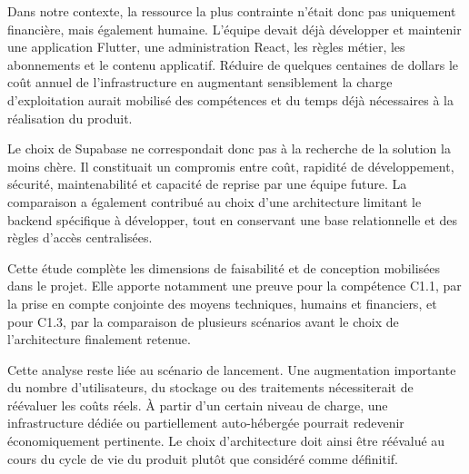 Dans notre contexte, la ressource la plus contrainte n'était donc pas uniquement financière, mais également humaine. L'équipe devait déjà développer et maintenir une application Flutter, une administration React, les règles métier, les abonnements et le contenu applicatif. Réduire de quelques centaines de dollars le coût annuel de l'infrastructure en augmentant sensiblement la charge d'exploitation aurait mobilisé des compétences et du temps déjà nécessaires à la réalisation du produit.

Le choix de Supabase ne correspondait donc pas à la recherche de la solution la moins chère. Il constituait un compromis entre coût, rapidité de développement, sécurité, maintenabilité et capacité de reprise par une équipe future. La comparaison a également contribué au choix d'une architecture limitant le backend spécifique à développer, tout en conservant une base relationnelle et des règles d'accès centralisées.

Cette étude complète les dimensions de faisabilité et de conception mobilisées dans le projet. Elle apporte notamment une preuve pour la compétence C1.1, par la prise en compte conjointe des moyens techniques, humains et financiers, et pour C1.3, par la comparaison de plusieurs scénarios avant le choix de l'architecture finalement retenue.

Cette analyse reste liée au scénario de lancement. Une augmentation importante du nombre d'utilisateurs, du stockage ou des traitements nécessiterait de réévaluer les coûts réels. À partir d'un certain niveau de charge, une infrastructure dédiée ou partiellement auto-hébergée pourrait redevenir économiquement pertinente. Le choix d'architecture doit ainsi être réévalué au cours du cycle de vie du produit plutôt que considéré comme définitif.



